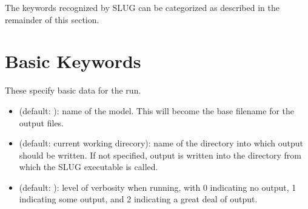 \documentclass[letterpaper,10pt,english]{sphinxmanual}
\begin{document}
The keywords recognized by SLUG can be categorized as described in the remainder of this section.


\section{Basic Keywords}
\label{\detokenize{parameters:basic-keywords}}\label{\detokenize{parameters:ssec-basic-keywords}}
These specify basic data for the run.
\begin{itemize}
\item {} 
 (default: ): name of the model. This will become the base filename for the output files.

\item {} 
 (default: current working direcory): name of the directory into which output should be written. If not specified, output is written into the directory from which the SLUG executable is called.

\item {} 
 (default: ): level of verbosity when running, with 0 indicating no output, 1 indicating some output, and 2 indicating a great deal of output.

\end{itemize}
\end{document}
